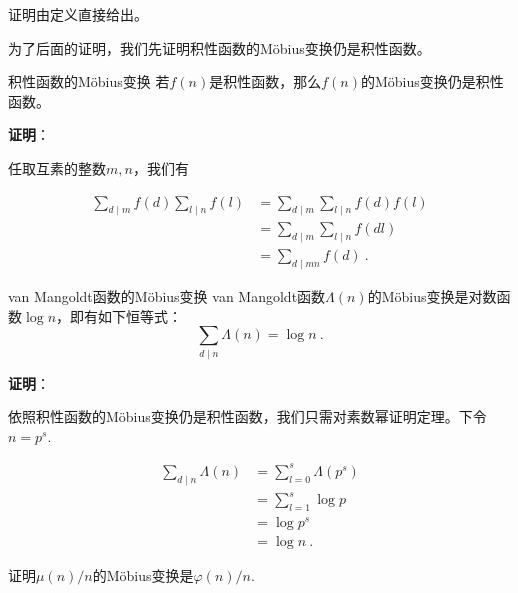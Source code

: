 证明由定义直接给出。

为了后面的证明，我们先证明积性函数的Möbius变换仍是积性函数。

\begin{theorem}{积性函数的Möbius变换}
若$f(n)$是积性函数，那么$f(n)$的Möbius变换仍是积性函数。
\end{theorem}

\textbf{证明}：

任取互素的整数$m,n$，我们有

\begin{equation}
\begin{aligned}
\sum_{d\mid m}f(d)\sum_{l\mid n}f(l)&=\sum_{d\mid m}\sum_{l\mid n}f(d)f(l)\\
&=\sum_{d\mid m}\sum_{l\mid n}f(dl)\\
&=\sum_{d\mid mn}f(d)~.
\end{aligned}
\end{equation}

\begin{theorem}{van Mangoldt函数的Möbius变换}
van Mangoldt函数$\Lambda(n)$的Möbius变换是对数函数$\log n$，即有如下恒等式：
\begin{equation}
\sum_{d\mid n}\Lambda(n)=\log{n}~.
\end{equation}
\end{theorem}

\textbf{证明}：

依照积性函数的Möbius变换仍是积性函数，我们只需对素数幂证明定理。下令$n=p^s$.

\begin{equation}
\begin{aligned}
\sum_{d\mid n}\Lambda(n)&=\sum_{l=0}^s \Lambda(p^s)\\
&=\sum_{l=1}^s \log p\\
&=\log p^s\\
&=\log n~.
\end{aligned}
\end{equation}

\begin{exercise}{}
证明$\mu(n)/n$的Möbius变换是$\varphi(n)/n$.
\end{exercise}
